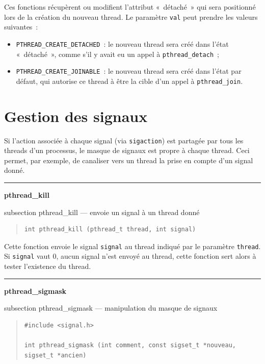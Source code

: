 \documentclass [twoside] {report}
\newcommand {\primitive} [1]
    {
	\phantomsection
	{\large \textbf {#1}}
	\addcontentsline {toc} {subsection} {#1}
    }
\newcommand {\separation}
    {
	\vspace {5mm}
	\nopagebreak
	\hrule
    }
\begin{document}
Ces fonctions récupèrent ou modifient l'attribut «~détaché~» qui
sera positionné lors de la création du nouveau thread. Le paramètre
\texttt {val} peut prendre les valeurs suivantes~:

\begin {itemize}
    \item \verb|PTHREAD_CREATE_DETACHED|~: le nouveau thread sera
	créé dans l'état «~détaché~», comme s'il y avait eu un appel
	à \verb|pthread_detach|~;
    \item \verb|PTHREAD_CREATE_JOINABLE|~: le nouveau thread sera
	créé dans l'état par défaut, qui autorise ce thread à être
	la cible d'un appel à \verb|pthread_join|.
\end {itemize}


\section {Gestion des signaux}

Si l'action associée à chaque signal (via \texttt {sigaction}) est
partagée par tous les threads d'un processus, le masque de signaux est
propre à chaque thread. Ceci permet, par exemple, de canaliser vers un
thread la prise en compte d'un signal donné.


\separation 
\primitive {pthread\_kill} --- envoie un signal à un thread donné

\begin {quote}
\begin {verbatim}
int pthread_kill (pthread_t thread, int signal)
\end{verbatim}
\end {quote}

Cette fonction envoie le signal \texttt {signal} au thread indiqué par le
paramètre \texttt {thread}.  Si \texttt {signal} vaut 0, aucun signal
n'est envoyé au thread, cette fonction sert alors à tester l'existence
du thread.


\separation
\primitive {pthread\_sigmask} --- manipulation du masque de signaux

\begin {quote}
\begin {verbatim}
#include <signal.h>

int pthread_sigmask (int comment, const sigset_t *nouveau, sigset_t *ancien)
\end{verbatim}
\end {quote}
\end{document}
